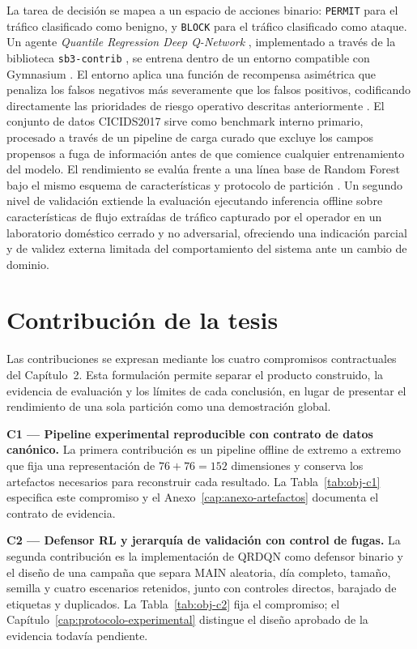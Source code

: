 La tarea de decisión se mapea a un espacio de acciones binario: \texttt{PERMIT} para el tráfico clasificado como benigno, y \texttt{BLOCK} para el tráfico clasificado como ataque. Un agente \textit{Quantile Regression Deep Q-Network} \parencite{Dabney2018QRDQN}, implementado a través de la biblioteca \texttt{sb3-contrib} \parencite{SB3ContribQRDQNDocs}, se entrena dentro de un entorno compatible con Gymnasium \parencite{GymnasiumDocs}. El entorno aplica una función de recompensa asimétrica que penaliza los falsos negativos más severamente que los falsos positivos, codificando directamente las prioridades de riesgo operativo descritas anteriormente \parencite{Cardenas2006IDSFramework}. El conjunto de datos CICIDS2017 \parencite{Sharafaldin2018CICIDS2017,CICIDS2017Web} sirve como benchmark interno primario, procesado a través de un pipeline de carga curado que excluye los campos propensos a fuga de información antes de que comience cualquier entrenamiento del modelo. El rendimiento se evalúa frente a una línea base de Random Forest bajo el mismo esquema de características y protocolo de partición \parencite{Engelen2021CICIDSIssues}. Un segundo nivel de validación extiende la evaluación ejecutando inferencia offline sobre características de flujo extraídas de tráfico capturado por el operador en un laboratorio doméstico cerrado y no adversarial, ofreciendo una indicación parcial y de validez externa limitada del comportamiento del sistema ante un cambio de dominio.

\section{Contribución de la tesis}
Las contribuciones se expresan mediante los cuatro compromisos contractuales del Capítulo~2. Esta formulación permite separar el producto construido, la evidencia de evaluación y los límites de cada conclusión, en lugar de presentar el rendimiento de una sola partición como una demostración global.

\textbf{C1 --- Pipeline experimental reproducible con contrato de datos canónico.} La primera contribución es un pipeline offline de extremo a extremo que fija una representación de $76+76=152$ dimensiones y conserva los artefactos necesarios para reconstruir cada resultado. La Tabla~\ref{tab:obj-c1} especifica este compromiso y el Anexo~\ref{cap:anexo-artefactos} documenta el contrato de evidencia.

\textbf{C2 --- Defensor RL y jerarquía de validación con control de fugas.} La segunda contribución es la implementación de QRDQN como defensor binario y el diseño de una campaña que separa MAIN aleatoria, día completo, tamaño, semilla y cuatro escenarios retenidos, junto con controles directos, barajado de etiquetas y duplicados. La Tabla~\ref{tab:obj-c2} fija el compromiso; el Capítulo~\ref{cap:protocolo-experimental} distingue el diseño aprobado de la evidencia todavía pendiente.

